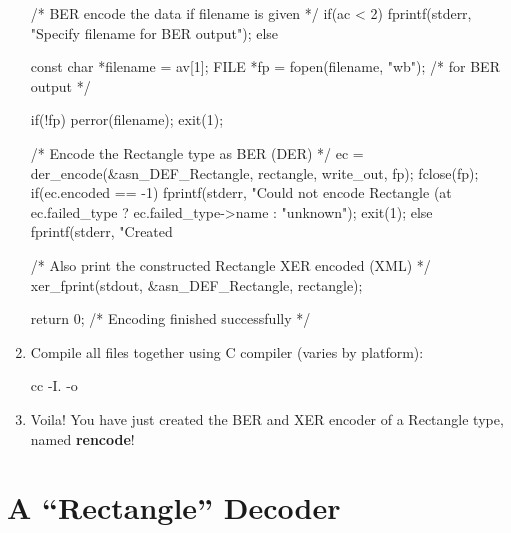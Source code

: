 \documentclass[english,oneside,12pt]{book}
\begin{document}
\begin{enumerate}
\begin{codesample}[basicstyle=\scriptsize\listingfont]
{    /* BER encode the data if filename is given */
    if(ac < 2) {
        fprintf(stderr, "Specify filename for BER output\n");
    } else {
        const char *filename = av[1];
        FILE *fp = fopen(filename, "wb");   /* for BER output */
 
        if(!fp) {
          perror(filename);
          exit(1);
        }

        /* Encode the Rectangle type as BER (DER) */
        ec = der_encode(&asn_DEF_Rectangle, rectangle, write_out, fp);
        fclose(fp);
        if(ec.encoded == -1) {
          fprintf(stderr, "Could not encode Rectangle (at %
              ec.failed_type ? ec.failed_type->name : "unknown");
          exit(1);
        } else {
          fprintf(stderr, "Created %
        }
    }

    /* Also print the constructed Rectangle XER encoded (XML) */
    xer_fprint(stdout, &asn_DEF_Rectangle, rectangle);

    return 0; /* Encoding finished successfully */
 }
\end{codesample}
\item Compile all files together using C compiler (varies by platform):

\begin{bash}
cc -I. -o %
\end{bash}
\item Voila! You have just created the BER and XER encoder of a Rectangle
type, named \textbf{rencode}!
\end{enumerate}

\section{\label{sec:A-Rectangle-Decoder}A ``Rectangle'' Decoder}
\end{document}
